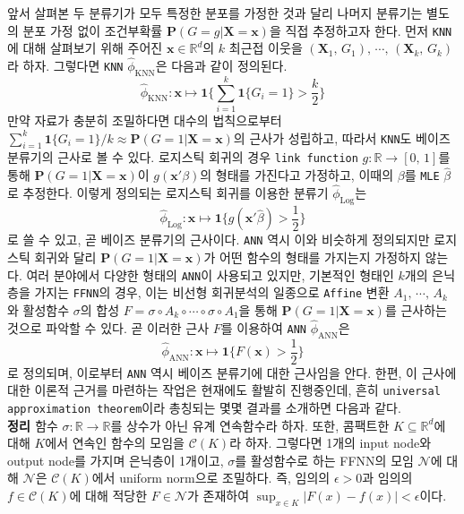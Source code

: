 \documentclass[10pt,onecolumn,twoside,a4size]{gsag3jnl}
\begin{document}
앞서 살펴본 두 분류기가 모두 특정한 분포를 가정한 것과 달리 나머지 분류기는 별도의 분포 가정 없이 조건부확률 $\mathbf{P}(G=g\vert\mathbf{X}=\mathbf{x})$을 직접 추정하고자 한다. 먼저 \texttt{KNN}에 대해 살펴보기 위해 주어진 $\mathbf{x}\in\mathbb{R}^d$의 $k$ 최근접 이웃을 $(\mathbf{X}_1,\,G_1),\,\cdots,\,(\mathbf{X}_k,\,G_k)$라 하자. 그렇다면 \texttt{KNN} $\widehat{\phi}_\mathrm{KNN}$은 다음과 같이 정의된다.
\begin{equation}\label{eq:KNN}
  \widehat{\phi}_\mathrm{KNN}:\mathbf{x}\mapsto\mathbf{1}\bigg\{\sum_{i=1}^k\mathbf{1}\{G_i=1\}>\frac{k}{2}\bigg\}
\end{equation}
만약 자료가 충분히 조밀하다면 대수의 법칙으로부터 $\sum_{i=1}^k\mathbf{1}\{G_i=1\}/k\approx\mathbf{P}(G=1\vert\mathbf{X}=\mathbf{x})$의 근사가 성립하고, 따라서 \texttt{KNN}도 베이즈 분류기의 근사로 볼 수 있다. 로지스틱 회귀의 경우 \texttt{link function} $g:\mathbb{R}\to[0,\,1]$를 통해 $\mathbf{P}(G=1\vert\mathbf{X}=\mathbf{x})$이 $g(\mathbf{x}'\beta)$의 형태를 가진다고 가정하고, 이때의 $\beta$를 \texttt{MLE} $\widehat{\beta}$로 추정한다. 이렇게 정의되는 로지스틱 회귀를 이용한 분류기 $\widehat{\phi}_\mathrm{Log}$는
\begin{equation}
  \widehat{\phi}_\mathrm{Log}:\mathbf{x}\mapsto\mathbf{1}\bigg\{g(\mathbf{x}'\widehat{\beta})>\frac{1}{2}\bigg\}
\end{equation}
로 쓸 수 있고, 곧 베이즈 분류기의 근사이다. \texttt{ANN} 역시 이와 비슷하게 정의되지만 로지스틱 회귀와 달리 $\mathbf{P}(G=1\vert\mathbf{X}=\mathbf{x})$가 어떤 함수의 형태를 가지는지 가정하지 않는다. 여러 분야에서 다양한 형태의 \texttt{ANN}이 사용되고 있지만, 기본적인 형태인 $k$개의 은닉층을 가지는 \texttt{FFNN}의 경우, 이는 비선형 회귀분석의 일종으로 \texttt{Affine} 변환 $A_1,\,\cdots,\,A_k$와 활성함수 $\sigma$의 합성 $F=\sigma\circ A_k\circ\cdots\circ\sigma\circ A_1$을 통해 $\mathbf{P}(G=1\vert\mathbf{X}=\mathbf{x})$를 근사하는 것으로 파악할 수 있다. 곧 이러한 근사 $F$를 이용하여 \texttt{ANN} $\widehat{\phi}_\mathrm{ANN}$은
\begin{equation}
  \widehat{\phi}_\mathrm{ANN}:\mathbf{x}\mapsto\mathbf{1}\bigg\{F(\mathbf{x})>\frac{1}{2}\bigg\}
\end{equation}
로 정의되며, 이로부터 \texttt{ANN} 역시 베이즈 분류기에 대한 근사임을 안다. 한편, 이 근사에 대한 이론적 근거를 마련하는 작업은 현재에도 활발히 진행중인데, 흔히 \texttt{universal approximation theorem}이라 총칭되는 몇몇 결과를 소개하면 다음과 같다.\\

\noindent\textsf{\textbf{정리 \citep{Cybenko1989}} 함수 $\sigma:\mathbb{R}\to\mathbb{R}$를 상수가 아닌 유계 연속함수라 하자. 또한, 콤팩트한 $K\subseteq\mathbb{R}^d$에 대해 $K$에서 연속인 함수의 모임을 $\mathcal{C}(K)$라 하자. 그렇다면 1개의 input node와 output node를 가지며 은닉층이 1개이고, $\sigma$를 활성함수로 하는 FFNN의 모임 $\mathcal{N}$에 대해 $\mathcal{N}$은 $\mathcal{C}(K)$에서 uniform norm으로 조밀하다. 즉, 임의의 $\epsilon>0$과 임의의 $f\in\mathcal{C}(K)$에 대해 적당한 $F\in\mathcal{N}$가 존재하여 $\sup_{x\in K}|F(x)-f(x)|<\epsilon$이다.}\\
\end{document}
